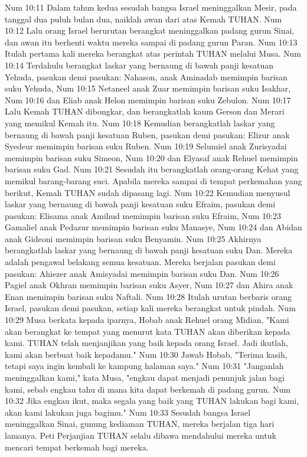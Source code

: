 Num 10:11  Dalam tahun kedua sesudah bangsa Israel meninggalkan Mesir, pada tanggal dua puluh bulan dua, naiklah awan dari atas Kemah TUHAN.
Num 10:12  Lalu orang Israel berurutan berangkat meninggalkan padang gurun Sinai, dan awan itu berhenti waktu mereka sampai di padang gurun Paran.
Num 10:13  Itulah pertama kali mereka berangkat atas perintah TUHAN melalui Musa.
Num 10:14  Terdahulu berangkat laskar yang bernaung di bawah panji kesatuan Yehuda, pasukan demi pasukan: Nahason, anak Aminadab memimpin barisan suku Yehuda,
Num 10:15  Netaneel anak Zuar memimpin barisan suku Isakhar,
Num 10:16  dan Eliab anak Helon memimpin barisan suku Zebulon.
Num 10:17  Lalu Kemah TUHAN dibongkar, dan berangkatlah kaum Gerson dan Merari yang memikul Kemah itu.
Num 10:18  Kemudian berangkatlah laskar yang bernaung di bawah panji kesatuan Ruben, pasukan demi pasukan: Elizur anak Syedeur memimpin barisan suku Ruben.
Num 10:19  Selumiel anak Zurisyadai memimpin barisan suku Simeon,
Num 10:20  dan Elyasaf anak Rehuel memimpin barisan suku Gad.
Num 10:21  Sesudah itu berangkatlah orang-orang Kehat yang memikul barang-barang suci. Apabila mereka sampai di tempat perkemahan yang berikut, Kemah TUHAN sudah dipasang lagi.
Num 10:22  Kemudian menyusul laskar yang bernaung di bawah panji kesatuan suku Efraim, pasukan demi pasukan: Elisama anak Amihud memimpin barisan suku Efraim,
Num 10:23  Gamaliel anak Pedazur memimpin barisan suku Manasye,
Num 10:24  dan Abidan anak Gideoni memimpin barisan suku Benyamin.
Num 10:25  Akhirnya berangkatlah laskar yang bernaung di bawah panji kesatuan suku Dan. Mereka adalah pengawal belakang semua kesatuan. Mereka berjalan pasukan demi pasukan: Ahiezer anak Amisyadai memimpin barisan suku Dan.
Num 10:26  Pagiel anak Okhran memimpin barisan suku Asyer,
Num 10:27  dan Ahira anak Enan memimpin barisan suku Naftali.
Num 10:28  Itulah urutan berbaris orang Israel, pasukan demi pasukan, setiap kali mereka berangkat untuk pindah.
Num 10:29  Musa berkata kepada iparnya, Hobab anak Rehuel orang Midian, "Kami akan berangkat ke tempat yang menurut kata TUHAN akan diberikan kepada kami. TUHAN telah menjanjikan yang baik kepada orang Israel. Jadi ikutlah, kami akan berbuat baik kepadamu."
Num 10:30  Jawab Hobab, "Terima kasih, tetapi saya ingin kembali ke kampung halaman saya."
Num 10:31  "Janganlah meninggalkan kami," kata Musa, "engkau dapat menjadi penunjuk jalan bagi kami, sebab engkau tahu di mana kita dapat berkemah di padang gurun.
Num 10:32  Jika engkau ikut, maka segala yang baik yang TUHAN lakukan bagi kami, akan kami lakukan juga bagimu."
Num 10:33  Sesudah bangsa Israel meninggalkan Sinai, gunung kediaman TUHAN, mereka berjalan tiga hari lamanya. Peti Perjanjian TUHAN selalu dibawa mendahului mereka untuk mencari tempat berkemah bagi mereka.
